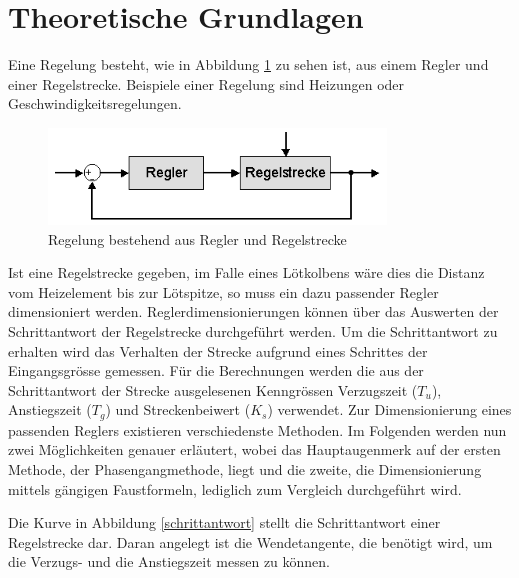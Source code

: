 \section{Theoretische Grundlagen}
Eine Regelung besteht, wie in Abbildung \ref{regelstrecke} zu sehen ist, aus einem Regler und einer Regelstrecke. Beispiele einer Regelung sind Heizungen oder Geschwindigkeitsregelungen.\newline 

\begin{figure}[h]
\centering
\includegraphics[width=0.8\textwidth]{Regelstrecke.png}
\caption{Regelung bestehend aus Regler und Regelstrecke}
\label{regelstrecke}
\end{figure}


Ist eine Regelstrecke gegeben, im Falle eines Lötkolbens wäre dies die Distanz vom Heizelement bis zur Lötspitze, so muss ein dazu passender Regler dimensioniert werden. Reglerdimensionierungen können über das Auswerten der Schrittantwort der Regelstrecke durchgeführt werden. Um die Schrittantwort zu erhalten wird das Verhalten der Strecke aufgrund eines Schrittes der Eingangsgrösse gemessen. Für die Berechnungen werden die aus der Schrittantwort der Strecke ausgelesenen Kenngrössen Verzugszeit ($T_u$), Anstiegszeit ($T_g$) und Streckenbeiwert ($K_s$) verwendet. Zur Dimensionierung eines passenden Reglers existieren verschiedenste Methoden. Im Folgenden werden nun zwei Möglichkeiten genauer erläutert, wobei das Hauptaugenmerk auf der ersten Methode, der Phasengangmethode, liegt und die zweite, die Dimensionierung mittels gängigen Faustformeln, lediglich zum Vergleich durchgeführt wird.\newline

\newpage
Die Kurve in Abbildung \ref{schrittantwort} stellt die Schrittantwort einer Regelstrecke dar. Daran angelegt ist die Wendetangente, die benötigt wird, um die Verzugs- und die Anstiegszeit messen zu können.\newline

